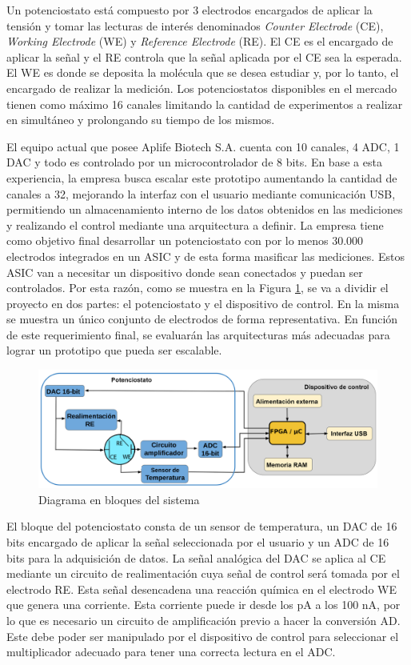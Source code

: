 \documentclass[11pt]{charter}
\begin{document}
Un potenciostato está compuesto por 3 electrodos encargados de aplicar la tensión y tomar las lecturas de interés denominados \textit{Counter Electrode} (CE), \textit{Working Electrode} (WE) y \textit{Reference Electrode} (RE). El CE es el encargado de aplicar la señal y el RE controla que la señal aplicada por el CE sea la esperada. El WE es donde se deposita la molécula que se desea estudiar y, por lo tanto, el encargado de realizar la medición. Los potenciostatos disponibles en el mercado tienen como máximo 16  canales limitando la cantidad de experimentos a realizar en simultáneo y prolongando su tiempo de los mismos. 

El equipo actual que posee Aplife Biotech S.A. cuenta con 10 canales, 4 ADC, 1 DAC y todo es controlado por un microcontrolador de 8 bits. En base a esta experiencia, la empresa busca escalar este prototipo aumentando la cantidad de canales a 32, mejorando la interfaz con el usuario mediante comunicación USB, permitiendo un almacenamiento interno de los datos obtenidos en las mediciones y realizando el control mediante una arquitectura a definir. La empresa tiene como objetivo final desarrollar un potenciostato con por lo menos 30.000 electrodos integrados en un ASIC y de esta forma masificar las mediciones. Estos ASIC van a necesitar un dispositivo donde sean conectados y puedan ser controlados. Por esta razón, como se muestra en la Figura \ref{fig:diagBloques}, se va a dividir el proyecto en dos partes: el potenciostato y el dispositivo de control. En la misma se muestra un único conjunto de electrodos de forma representativa.
En función de este requerimiento final, se evaluarán las arquitecturas más adecuadas para lograr un prototipo que pueda ser escalable.

\begin{figure}[!ht]
\centering 
\includegraphics[width=1\textwidth]{./Figuras/diagrama_bloques.png}
\caption{Diagrama en bloques del sistema}
\label{fig:diagBloques}
\end{figure}

El bloque del potenciostato consta de un sensor de temperatura, un DAC de 16 bits encargado de aplicar la señal seleccionada por el usuario y un ADC de 16 bits para la adquisición de datos. La señal analógica del DAC se aplica al CE mediante un circuito de realimentación cuya señal de control será tomada por el electrodo RE. Esta señal desencadena una reacción química en el electrodo WE que genera una corriente. Esta corriente puede ir desde los pA a los 100 nA, por lo que es necesario un circuito de amplificación previo a hacer la conversión AD. Este debe poder ser manipulado por el dispositivo de control para seleccionar el multiplicador adecuado para tener una correcta lectura en el ADC.
\end{document}
